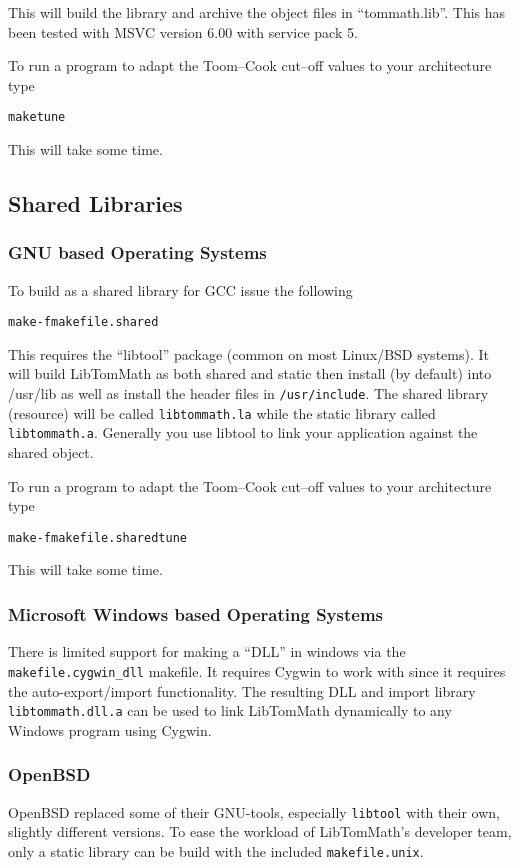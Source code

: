 \documentclass[synpaper]{book}
\begin{document}
This will build the library and archive the object files in ``tommath.lib''.  This has been tested
with MSVC version 6.00 with service pack 5.

To run a program to adapt the Toom--Cook cut--off values to your architecture type
\begin{alltt}
make tune
\end{alltt}
This will take some time.

\subsection{Shared Libraries}
\subsubsection{GNU based Operating Systems}
To build as a shared library for GCC issue the following
\begin{alltt}
make -f makefile.shared
\end{alltt}
This requires the ``libtool'' package (common on most Linux/BSD systems).  It will build LibTomMath
as both shared and static then install (by default) into /usr/lib as well as install the header
files in \texttt{/usr/include}.  The shared library (resource) will be called
\texttt{libtommath.la} while the static library called \texttt{libtommath.a}. Generally you use
libtool to link your application against the shared object.

To run a program to adapt the Toom--Cook cut--off values to your architecture type
\begin{alltt}
make -f makefile.shared tune
\end{alltt}
This will take some time.

\subsubsection{Microsoft Windows based Operating Systems}
There is limited support for making a ``DLL'' in windows via the \texttt{makefile.cygwin\_dll}
makefile.  It requires Cygwin to work with since it requires the auto-export/import functionality.
The resulting DLL and import library \texttt{libtommath.dll.a} can be used to link LibTomMath
dynamically to any Windows program using Cygwin.

\subsubsection{OpenBSD}
OpenBSD replaced some of their GNU-tools, especially \texttt{libtool} with their own, slightly
different versions. To ease the workload of LibTomMath's developer team, only a static library can
be build with the included \texttt{makefile.unix}.
\end{document}
